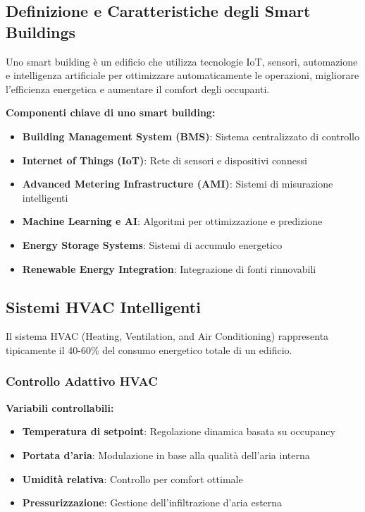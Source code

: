 \documentclass[12pt,a4paper,twoside]{report}
\begin{document}
\subsection{Definizione e Caratteristiche degli Smart Buildings}

Uno smart building è un edificio che utilizza tecnologie IoT, sensori, automazione e intelligenza artificiale per ottimizzare automaticamente le operazioni, migliorare l'efficienza energetica e aumentare il comfort degli occupanti.

\textbf{Componenti chiave di uno smart building:}
\begin{itemize}
    \item \textbf{Building Management System (BMS)}: Sistema centralizzato di controllo
    \item \textbf{Internet of Things (IoT)}: Rete di sensori e dispositivi connessi
    \item \textbf{Advanced Metering Infrastructure (AMI)}: Sistemi di misurazione intelligenti
    \item \textbf{Machine Learning e AI}: Algoritmi per ottimizzazione e predizione
    \item \textbf{Energy Storage Systems}: Sistemi di accumulo energetico
    \item \textbf{Renewable Energy Integration}: Integrazione di fonti rinnovabili
\end{itemize}

\subsection{Sistemi HVAC Intelligenti}

Il sistema HVAC (Heating, Ventilation, and Air Conditioning) rappresenta tipicamente il 40-60\% del consumo energetico totale di un edificio.

\subsubsection{Controllo Adattivo HVAC}

\textbf{Variabili controllabili:}
\begin{itemize}
    \item \textbf{Temperatura di setpoint}: Regolazione dinamica basata su occupancy
    \item \textbf{Portata d'aria}: Modulazione in base alla qualità dell'aria interna
    \item \textbf{Umidità relativa}: Controllo per comfort ottimale
    \item \textbf{Pressurizzazione}: Gestione dell'infiltrazione d'aria esterna
\end{itemize}
\end{document}
